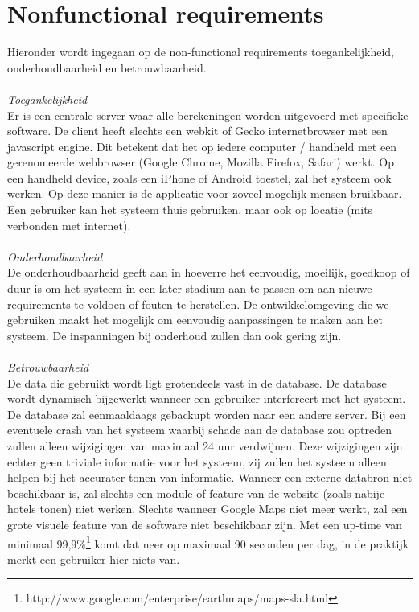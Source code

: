 \documentclass[a4paper,10pt]{article}
\begin{document}
		\section{Nonfunctional requirements}
			Hieronder wordt ingegaan op de non-functional requirements toegankelijkheid, onderhoudbaarheid en betrouwbaarheid.\\	\\
			\textit{Toegankelijkheid}\\
			Er is een centrale server waar alle berekeningen worden uitgevoerd met specifieke software. De client heeft slechts een webkit of Gecko internetbrowser met een javascript engine. Dit betekent dat het op iedere computer / handheld met een gerenomeerde webbrowser (Google Chrome, Mozilla Firefox, Safari) werkt. Op een handheld device, zoals een iPhone of Android toestel, zal het systeem ook werken. Op deze manier is de applicatie voor zoveel mogelijk mensen bruikbaar. Een gebruiker kan het systeem thuis gebruiken, maar ook op locatie (mits verbonden met internet).\\ \\
			\textit{Onderhoudbaarheid}\\
			De onderhoudbaarheid geeft aan in hoeverre het eenvoudig, moeilijk, goedkoop of duur is om het systeem in een later stadium aan te passen om aan nieuwe requirements te voldoen of fouten te herstellen. De ontwikkelomgeving die we gebruiken maakt het mogelijk om eenvoudig aanpassingen te maken aan het systeem. De inspanningen bij onderhoud zullen dan ook gering zijn.\\ \\
			\textit{Betrouwbaarheid}\\
			De data die gebruikt wordt ligt grotendeels vast in de database. De database wordt dynamisch bijgewerkt wanneer een gebruiker interfereert met het systeem. De database zal eenmaaldaags gebackupt worden naar een andere server. Bij een eventuele crash van het systeem waarbij schade aan de database zou optreden zullen alleen wijzigingen van maximaal 24 uur verdwijnen. Deze wijzigingen zijn echter geen triviale informatie voor het systeem, zij zullen het systeem alleen helpen bij het accurater tonen van informatie. Wanneer een externe databron niet beschikbaar is, zal slechts een module of feature van de website (zoals nabije hotels tonen) niet werken. Slechts wanneer Google Maps niet meer werkt, zal een grote visuele feature van de software niet beschikbaar zijn. Met een up-time van minimaal 99,9\%\footnote{http://www.google.com/enterprise/earthmaps/maps-sla.html} komt dat neer op maximaal 90 seconden per dag, in de praktijk merkt een gebruiker hier niets van.
			
\end{document}
